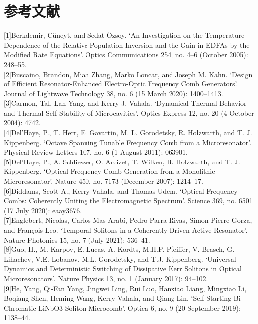 \section{参考文献}
[1]Berkdemir, Cüneyt, and Sedat Özsoy. ‘An Investigation on the Temperature Dependence of the Relative Population Inversion and the Gain in EDFAs by the Modified Rate Equations’. Optics Communications 254, no. 4–6 (October 2005): 248–55.\\


[2]Buscaino, Brandon, Mian Zhang, Marko Loncar, and Joseph M. Kahn. ‘Design of Efficient Resonator-Enhanced Electro-Optic Frequency Comb Generators’. Journal of Lightwave Technology 38, no. 6 (15 March 2020): 1400–1413.\\


[3]Carmon, Tal, Lan Yang, and Kerry J. Vahala. ‘Dynamical Thermal Behavior and Thermal Self-Stability of Microcavities’. Optics Express 12, no. 20 (4 October 2004): 4742.\\


[4]Del’Haye, P., T. Herr, E. Gavartin, M. L. Gorodetsky, R. Holzwarth, and T. J. Kippenberg. ‘Octave Spanning Tunable Frequency Comb from a Microresonator’. Physical Review Letters 107, no. 6 (1 August 2011): 063901.\\


[5]Del’Haye, P., A. Schliesser, O. Arcizet, T. Wilken, R. Holzwarth, and T. J. Kippenberg. ‘Optical Frequency Comb Generation from a Monolithic Microresonator’. Nature 450, no. 7173 (December 2007): 1214–17. \\


[6]Diddams, Scott A., Kerry Vahala, and Thomas Udem. ‘Optical Frequency Combs: Coherently Uniting the Electromagnetic Spectrum’. Science 369, no. 6501 (17 July 2020): eaay3676. \\


[7]Englebert, Nicolas, Carlos Mas Arabí, Pedro Parra-Rivas, Simon-Pierre Gorza, and François Leo. ‘Temporal Solitons in a Coherently Driven Active Resonator’. Nature Photonics 15, no. 7 (July 2021): 536–41. \\


[8]Guo, H., M. Karpov, E. Lucas, A. Kordts, M.H.P. Pfeiffer, V. Brasch, G. Lihachev, V.E. Lobanov, M.L. Gorodetsky, and T.J. Kippenberg. ‘Universal Dynamics and Deterministic Switching of Dissipative Kerr Solitons in Optical Microresonators’. Nature Physics 13, no. 1 (January 2017): 94–102. \\


[9]He, Yang, Qi-Fan Yang, Jingwei Ling, Rui Luo, Hanxiao Liang, Mingxiao Li, Boqiang Shen, Heming Wang, Kerry Vahala, and Qiang Lin. ‘Self-Starting Bi-Chromatic LiNbO3 Soliton Microcomb’. Optica 6, no. 9 (20 September 2019): 1138–44. \\


